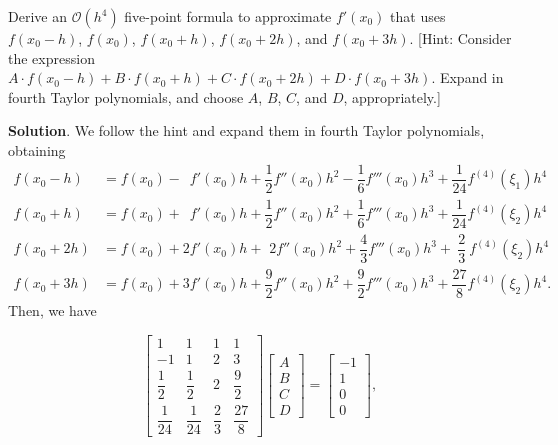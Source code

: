 \documentclass[11pt]{article}
\renewcommand{\arraystretch}{0.75}
\theoremstyle{break}
\numberwithin{equation}{theorem}
\begin{document}
\newpage
\begin{problem}\label{problem 3} %
    Derive an $\mathcal{O}(h^4)$ five-point formula to approximate $f'(x_0)$ that uses $f(x_0-h)$, $f(x_0)$, $f(x_0+h)$, $f(x_0+2h)$, and $f(x_0+3h)$. [Hint: Consider the expression $A\cdot f(x_0-h)+B\cdot f(x_0+h)+C\cdot f(x_0+2h) + D\cdot f(x_0+3h)$. Expand in fourth Taylor polynomials, and choose $A$, $B$, $C$, and $D$, appropriately.]
\end{problem}
\textbf{Solution}. We follow the hint and expand them in fourth Taylor polynomials, obtaining
\begin{align*}
    f(x_0-h)&=f(x_0)-\phantom{1}f'(x_0)h+\dfrac{1}{2}f''(x_0)h^2-\dfrac{1}{6}f'''(x_0)h^3+\dfrac{1}{24}f^{(4)}(\xi_1)h^4\\
    f(x_0+h)&=f(x_0)+\phantom{1}f'(x_0)h+\dfrac{1}{2}f''(x_0)h^2+\dfrac{1}{6}f'''(x_0)h^3+\dfrac{1}{24}f^{(4)}(\xi_2)h^4\\
    f(x_0+2h)&=f(x_0)+2f'(x_0)h+\,\,\!2f''(x_0)h^2+\dfrac{4}{3}f'''(x_0)h^3+\ \dfrac{2}{3}\ f^{(4)}(\xi_2)h^4\\
    f(x_0+3h)&=f(x_0)+3f'(x_0)h+\dfrac{9}{2}f''(x_0)h^2+\dfrac{9}{2}f'''(x_0)h^3+\dfrac{27}{8}f^{(4)}(\xi_2)h^4.
\end{align*}
Then, we have \renewcommand{\arraystretch}{1}

\vspace{-1em}
\begin{equation*}
    \begin{bmatrix}
        1 & 1 & 1 & 1 \\
        -1 & 1 & 2 & 3 \\
        \dfrac{1}{2} & \dfrac{1}{2} & 2 & \dfrac{9}{2} \\
        \dfrac{1}{24} & \dfrac{1}{24} & \dfrac{2}{3} & \dfrac{27}{8}
    \end{bmatrix}\begin{bmatrix}
        A \\ B \\ C \\ D
    \end{bmatrix}=\begin{bmatrix}
        -1 \\ 1 \\ 0 \\ 0
    \end{bmatrix},
\end{equation*} \renewcommand{\arraystretch}{0.75}
\vspace{0.2em}
\end{document}

